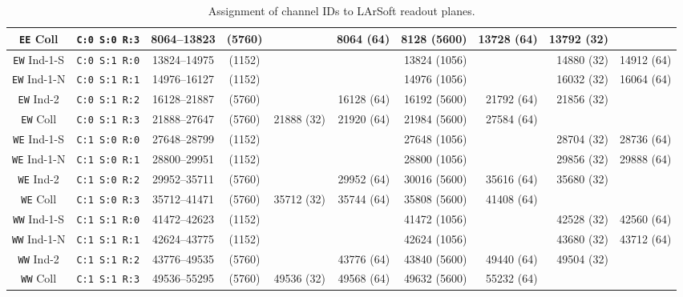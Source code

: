 \begin{table}
\begin{tabular}{|cc|cc|rrrrrr|}
    \texttt{EE} Coll    & \texttt{C:0 S:0 R:3} &  8064--13823 & (5760) &            &  8064 (64) &  8128 (5600) & 13728 (64) & 13792 (32) &            \\
    \hline
    \texttt{EW} Ind-1-S & \texttt{C:0 S:1 R:0} & 13824--14975 & (1152) &            &            & 13824 (1056) &            & 14880 (32) & 14912 (64) \\
    \texttt{EW} Ind-1-N & \texttt{C:0 S:1 R:1} & 14976--16127 & (1152) &            &            & 14976 (1056) &            & 16032 (32) & 16064 (64) \\
    \texttt{EW} Ind-2   & \texttt{C:0 S:1 R:2} & 16128--21887 & (5760) &            & 16128 (64) & 16192 (5600) & 21792 (64) & 21856 (32) &            \\
    \texttt{EW} Coll    & \texttt{C:0 S:1 R:3} & 21888--27647 & (5760) & 21888 (32) & 21920 (64) & 21984 (5600) & 27584 (64) &            &            \\
    \hline
    \hline
    \texttt{WE} Ind-1-S & \texttt{C:1 S:0 R:0} & 27648--28799 & (1152) &            &            & 27648 (1056) &            & 28704 (32) & 28736 (64) \\
    \texttt{WE} Ind-1-N & \texttt{C:1 S:0 R:1} & 28800--29951 & (1152) &            &            & 28800 (1056) &            & 29856 (32) & 29888 (64) \\
    \texttt{WE} Ind-2   & \texttt{C:1 S:0 R:2} & 29952--35711 & (5760) &            & 29952 (64) & 30016 (5600) & 35616 (64) & 35680 (32) &            \\
    \texttt{WE} Coll    & \texttt{C:1 S:0 R:3} & 35712--41471 & (5760) & 35712 (32) & 35744 (64) & 35808 (5600) & 41408 (64) &            &            \\
    \hline
    \texttt{WW} Ind-1-S & \texttt{C:1 S:1 R:0} & 41472--42623 & (1152) &            &            & 41472 (1056) &            & 42528 (32) & 42560 (64) \\
    \texttt{WW} Ind-1-N & \texttt{C:1 S:1 R:1} & 42624--43775 & (1152) &            &            & 42624 (1056) &            & 43680 (32) & 43712 (64) \\
    \texttt{WW} Ind-2   & \texttt{C:1 S:1 R:2} & 43776--49535 & (5760) &            & 43776 (64) & 43840 (5600) & 49440 (64) & 49504 (32) &            \\
    \texttt{WW} Coll    & \texttt{C:1 S:1 R:3} & 49536--55295 & (5760) & 49536 (32) & 49568 (64) & 49632 (5600) & 55232 (64) &            &            \\
    \hline
    \hline
  \end{tabular}
  \caption{
    Assignment of channel IDs to LArSoft readout planes.
    \label{table:LArSoftChannels}
  }
\end{table}


